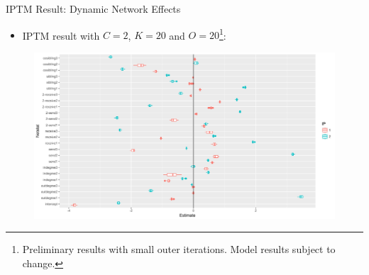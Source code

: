 \documentclass[10pt]{beamer}
\def\bni{\begin{itemize}} \def\ei{\end{itemize}}
\theoremstyle{definition}
\theoremstyle{remark}
\begin{document}
\begin{frame}{IPTM Result: Dynamic Network Effects}
	\bni \item IPTM result with $C=2$, $K=20$ and $O= 20$\footnote{Preliminary results with small outer iterations. Model results subject to change.}:
	\ei
	\begin{figure}
		\includegraphics[width=1\textwidth]{figures/DareBplot2.pdf}
	\end{figure}	
\end{frame}
\end{document}
